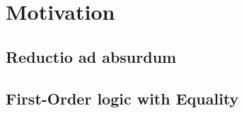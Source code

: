 
\section{Motivation}

\subsection{Reductio ad absurdum}

\begin{frame}
	
	
\end{frame}

\subsection{First-Order logic with Equality}

\begin{frame}
	
\end{frame}



\begin{frame}
	
\end{frame}

\begin{frame}
	
	\pause
	
\end{frame}

\begin{frame}
	
\end{frame}
	

